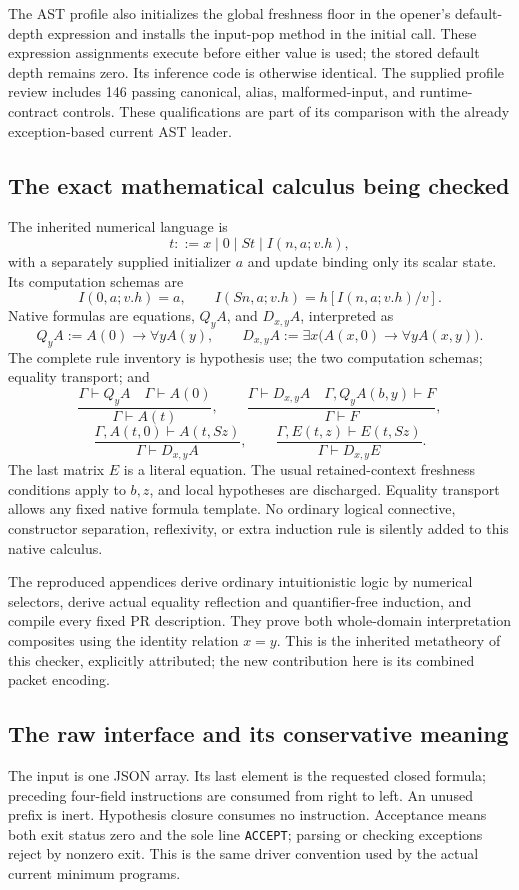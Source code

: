 The AST profile also initializes the global freshness floor in the opener's default-depth expression and installs the input-pop method in the initial call. These expression assignments execute before either value is used; the stored default depth remains zero. Its inference code is otherwise identical. The supplied profile review includes 146 passing canonical, alias, malformed-input, and runtime-contract controls. These qualifications are part of its comparison with the already exception-based current AST leader.

\subsection{The exact mathematical calculus being checked}
The inherited numerical language is
\[
 t::=x\mid0\mid St\mid I(n,a;v.h),
\]
with a separately supplied initializer $a$ and update binding only its scalar state. Its computation schemas are
\[
 I(0,a;v.h)=a,\qquad I(Sn,a;v.h)=h[I(n,a;v.h)/v].
\]
Native formulas are equations, $Q_yA$, and $D_{x,y}A$, interpreted as
\[
 Q_yA:=A(0)\to\forall yA(y),\qquad
 D_{x,y}A:=\exists x\bigl(A(x,0)\to\forall yA(x,y)\bigr).
\]
The complete rule inventory is hypothesis use; the two computation schemas; equality transport; and
\[
 \frac{\Gamma\vdash Q_yA\quad\Gamma\vdash A(0)}{\Gamma\vdash A(t)},
 \qquad
 \frac{\Gamma\vdash D_{x,y}A\quad\Gamma,Q_yA(b,y)\vdash F}{\Gamma\vdash F},
\]
\[
 \frac{\Gamma,A(t,0)\vdash A(t,Sz)}{\Gamma\vdash D_{x,y}A},
 \qquad
 \frac{\Gamma,E(t,z)\vdash E(t,Sz)}{\Gamma\vdash D_{x,y}E}.
\]
The last matrix $E$ is a literal equation. The usual retained-context freshness conditions apply to $b,z$, and local hypotheses are discharged. Equality transport allows any fixed native formula template. No ordinary logical connective, constructor separation, reflexivity, or extra induction rule is silently added to this native calculus.

The reproduced appendices derive ordinary intuitionistic logic by numerical selectors, derive actual equality reflection and quantifier-free induction, and compile every fixed PR description. They prove both whole-domain interpretation composites using the identity relation $x=y$. This is the inherited metatheory of this checker, explicitly attributed; the new contribution here is its combined packet encoding.

\subsection{The raw interface and its conservative meaning}
The input is one JSON array. Its last element is the requested closed formula; preceding four-field instructions are consumed from right to left. An unused prefix is inert. Hypothesis closure consumes no instruction. Acceptance means both exit status zero and the sole line \texttt{ACCEPT}; parsing or checking exceptions reject by nonzero exit. This is the same driver convention used by the actual current minimum programs.

